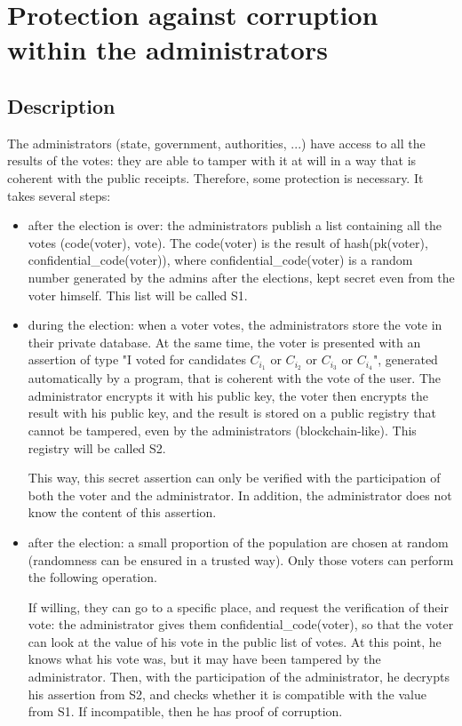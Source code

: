 \documentclass{article}
\begin{document}
\section{Protection against corruption within the administrators}

\subsection{Description}

The administrators (state, government, authorities, ...) have access to all the results of the votes: they are able to tamper with it at will in a way that is coherent with the public receipts. Therefore, some protection is necessary. It takes several steps:
\begin{itemize}
    \item after the election is over: the administrators publish a list containing all the votes (code(voter), vote). The code(voter) is the result of hash(pk(voter), confidential\_code(voter)), where confidential\_code(voter) is a random number generated by the admins after the elections, kept secret even from the voter himself. This list will be called S1.
    \item during the election: when a voter votes, the administrators store the vote in their private database. At the same time, the voter is presented with an assertion of type "I voted for candidates $C_{i_1}$ or $C_{i_2}$ or $C_{i_3}$ or $C_{i_4}$", generated automatically by a program, that is coherent with the vote of the user. The administrator encrypts it with his public key, the voter then encrypts the result with his public key, and the result is stored on a public registry that cannot be tampered, even by the administrators (blockchain-like). This registry will be called S2.
    
    This way, this secret assertion can only be verified with the participation of both the voter and the administrator. In addition, the administrator does not know the content of this assertion. 
    
    \item after the election: a small proportion of the population are chosen at random (randomness can be ensured in a trusted way). Only those voters can perform the following operation.
    
    If willing, they can go to a specific place, and request the verification of their vote: the administrator gives them confidential\_code(voter), so that the voter can look at the value of his vote in the public list of votes. At this point, he knows what his vote was, but it may have been tampered by the administrator. Then, with the participation of the administrator, he decrypts his assertion from S2, and checks whether it is compatible with the value from S1. If incompatible, then he has proof of corruption. 
\end{itemize}
\end{document}
